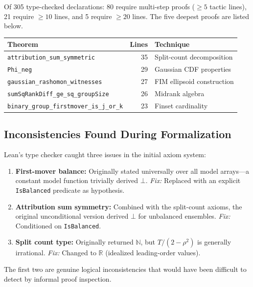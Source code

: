 \documentclass{jmlr}
\begin{document}
Of 305 type-checked declarations: 80 require multi-step proofs (${\geq}5$ tactic lines), 21 require ${\geq}10$ lines, and 5 require ${\geq}20$ lines. The five deepest proofs are listed below.

\begin{center}
\small
\begin{tabular}{@{}lrl@{}}
\toprule
\textbf{Theorem} & \textbf{Lines} & \textbf{Technique} \\
\midrule
\texttt{attribution\_sum\_symmetric} & 35 & Split-count decomposition \\
\texttt{Phi\_neg} & 29 & Gaussian CDF properties \\
\texttt{gaussian\_rashomon\_witnesses} & 27 & FIM ellipsoid construction \\
\texttt{sumSqRankDiff\_ge\_sq\_groupSize} & 26 & Midrank algebra \\
\texttt{binary\_group\_firstmover\_is\_j\_or\_k} & 23 & Finset cardinality \\
\bottomrule
\end{tabular}
\end{center}

\subsection{Inconsistencies Found During Formalization}

Lean's type checker caught three issues in the initial axiom system:

\begin{enumerate}
\item \textbf{First-mover balance:} Originally stated universally over all model arrays---a constant model function trivially derived $\bot$. \emph{Fix:} Replaced with an explicit \texttt{IsBalanced} predicate as hypothesis.

\item \textbf{Attribution sum symmetry:} Combined with the split-count axioms, the original unconditional version derived $\bot$ for unbalanced ensembles. \emph{Fix:} Conditioned on \texttt{IsBalanced}.

\item \textbf{Split count type:} Originally returned $\mathbb{N}$, but $T/(2-\rho^2)$ is generally irrational. \emph{Fix:} Changed to $\mathbb{R}$ (idealized leading-order values).
\end{enumerate}

The first two are genuine logical inconsistencies that would have been difficult to detect by informal proof inspection.
\end{document}
